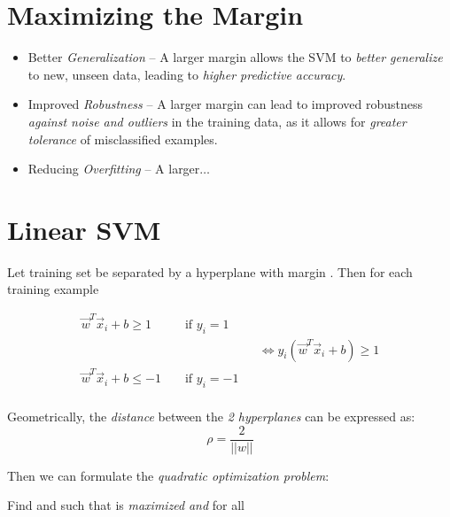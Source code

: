 \documentclass[
	number={2},
	title={Learning Linear Separators{,} SVMs and Kernels}
]{cs584notes}
\begin{document}
\section{Maximizing the Margin}\label{sec:maximizing-the-margin}
\begin{itemize}
	\item Better \emph{Generalization} -- A larger margin allows the SVM to \emph{better generalize} to new, unseen data, leading to \emph{higher predictive accuracy}.
	\item Improved \emph{Robustness} -- A larger margin can lead to improved robustness \emph{against noise and outliers} in the training data, as it allows for \emph{greater tolerance} of misclassified examples.
	\item Reducing \emph{Overfitting} -- A larger$\dots$
\end{itemize}

\section{Linear SVM}\label{sec:linear-svm}
Let training set  be separated by a hyperplane with margin \data{$\rho$}.
Then for each training example 

\begin{equation*}
\begin{aligned}
	\vec{w}^{T}\vec{x}_{i} + b \geq 1 && \mbox{ if } y_{i} = 1 &&\\
	&&&& \Leftrightarrow y_{i}\left( \vec{w}^{T}\vec{x}_{i} + b \right) \geq 1\\
	\vec{w}^{T}\vec{x}_{i} + b \leq -1 && \mbox{ if } y_{i} = -1 &&\\
\end{aligned}
\end{equation*}

Geometrically, the \emph{distance} between the \emph{2 hyperplanes} can be expressed as:
\begin{equation}
	\rho = \frac{2}{||w||}
	\label{eq:hyperplane-distance}
\end{equation}

Then we can formulate the \emph{quadratic optimization problem}:

\begin{svmbox}
	Find  and  such that \data{\[ \rho = \frac{2}{||\vec{w}||} \]} is \emph{maximized} \emph{and} for all 
\end{svmbox}
\end{document}
